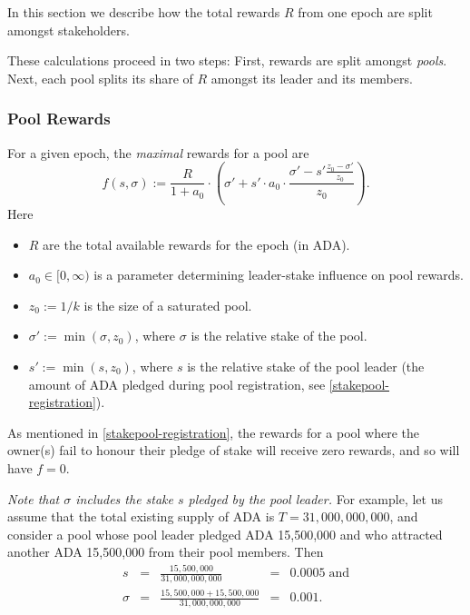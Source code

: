 \documentclass[11pt,a4paper]{article}
\begin{document}
In this section we describe how the total rewards \(R\) from one epoch
are split amongst stakeholders.

These calculations proceed in two steps: First, rewards are split
amongst \emph{pools}. Next, each pool splits its share of \(R\) amongst
its leader and its members.

\subsubsection{Pool Rewards}
\label{pool-rewards}

For a given epoch, the \emph{maximal} rewards for a pool are \[
    f(s,\sigma) :=
    \frac{R}{1 + a_0}
    \cdot
    \left(\sigma' + s'\cdot a_0\cdot\frac{\sigma' - s'\frac{z_0-\sigma'}{z_0}}{z_0}\right).
\] Here

\begin{itemize}
\item
  \(R\) are the total available rewards for the epoch (in ADA).
\item
  \(a_0\in[0,\infty)\) is a parameter determining leader-stake influence
  on pool rewards.
\item
  \(z_0:=1/k\) is the size of a saturated pool.
\item
  \(\sigma':=\min(\sigma, z_0)\), where \(\sigma\) is the relative stake
  of the pool.
\item
  \(s':=\min(s, z_0)\), where \(s\) is the relative stake of the pool
  leader (the amount of ADA pledged during pool registration,
  see \cref{stakepool-registration}).
\end{itemize}

As mentioned in \cref{stakepool-registration}, the rewards for a pool
where the owner(s) fail to honour their pledge of stake will receive
zero rewards, and so will have $f=0$.

\emph{Note that \(\sigma\) includes the stake \(s\) pledged by the pool
leader.} For example, let us assume that the total existing supply of
ADA is \(T=31,000,000,000\), and consider a pool whose pool leader
pledged ADA 15,500,000 and who attracted another ADA 15,500,000 from their
pool members. Then \[
\begin{array}{rcccl}
    s                  & = & \displaystyle\frac{15,500,000}{31,000,000,000}              & = & 0.0005\;\text{and} \\[5mm]
    \sigma & = & \displaystyle\frac{15,500,000 + 15,500,000}{31,000,000,000} & = & 0.001. \\
\end{array}
\]
\end{document}
